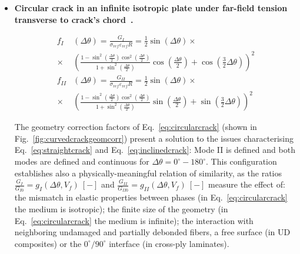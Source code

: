 \documentclass[review]{elsarticle}
\begin{document}
\begin{itemize}
\item \textbf{Circular crack in an infinite isotropic plate under far-field tension transverse to crack's chord~\cite{Ioakmidis1977}.}

\begin{equation}\label{eq:circularcrack}
\begin{aligned}
f_{I}&\left(\Delta\theta\right)=\frac{G_{I}}{\sigma_{ref}\varepsilon_{ref}R}=\frac{1}{2}\sin\left(\Delta\theta\right)\times\\\times&\left(\frac{1-\sin^{2}\left(\frac{\Delta\theta}{2}\right)\cos^{2}\left(\frac{\Delta\theta}{2}\right)}{1+\sin^{2}\left(\frac{\Delta\theta}{2}\right)}\cos\left(\frac{\Delta\theta}{2}\right)+\cos\left(\frac{3}{2}\Delta\theta\right)\right)^{2}\\
 f_{II}&\left(\Delta\theta\right)=\frac{G_{II}}{\sigma_{ref}\varepsilon_{ref}R}=\frac{1}{2}\sin\left(\Delta\theta\right)\times\\\times&\left(\frac{1-\sin^{2}\left(\frac{\Delta\theta}{2}\right)\cos^{2}\left(\frac{\Delta\theta}{2}\right)}{1+\sin^{2}\left(\frac{\Delta\theta}{2}\right)}\sin\left(\frac{\Delta\theta}{2}\right)+\sin\left(\frac{3}{2}\Delta\theta\right)\right)^{2}
\end{aligned}
\end{equation}

The geometry correction factors of Eq.~\ref{eq:circularcrack} (shown in Fig.~\ref{fig:curvedcrackgeomcorr}) present a solution to the issues characterising Eq.~\ref{eq:straightcrack} and Eq.~\ref{eq:inclinedcrack}: Mode II is defined and both modes are defined and continuous for $\Delta\theta=0^{\circ}-180^{\circ}$. This configuration establishes also a physically-meaningful relation of similarity, as the ratios $\frac{G_{I}}{G_{I0}}=g_{I}\left(\Delta\theta,V_{f}\right)\ \left[-\right]$ and $\frac{G_{II}}{G_{II0}}=g_{II}\left(\Delta\theta,V_{f}\right)\ \left[-\right]$ measure the effect of: the mismatch in elastic properties between phases (in Eq.~\ref{eq:circularcrack} the medium is isotropic); the finite size of the geometry (in Eq.~\ref{eq:circularcrack} the medium is infinite); the interaction with neighboring undamaged and partially debonded fibers, a free surface (in UD composites) or the $0^{\circ}/90^{\circ}$ interface (in cross-ply laminates).
\end{itemize}
\end{document}
